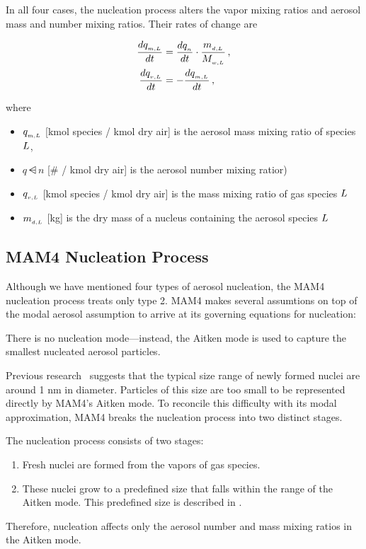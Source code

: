 In all four cases, the nucleation process alters the vapor mixing ratios and
aerosol mass and number mixing ratios. Their rates of change are

\begin{align}
\frac{d q\dsub{m,\specidx}}{dt} &= \frac{d q\dsub{n}}{dt} \cdot \frac{m\dsub{d,\specidx}}{\mw{\specidx}} \,, \labeleq{nuc:aer}\\
\frac{d\vmass{\specidx}}{dt} &= -\frac{d q\dsub{m,\specidx}}{dt} \,, \labeleq{nuc:gas}
\end{align}

where
\begin{itemize}
  \item $q_{_{m,L}}$ [kmol species / kmol dry air] is the aerosol mass
        mixing ratio of species $L$,
  \item $q\dsub{n}$ [\# / kmol dry air] is the aerosol number mixing ratior)
  \item $q_{_{v,L}}$ [kmol species / kmol dry air] is the mass mixing
        ratio of gas species $L$
  \item $m_{_{d,L}}$ [kg] is the dry mass of a nucleus containing the
        aerosol species $L$
\end{itemize}

\subsection{MAM4 Nucleation Process}

Although we have mentioned four types of aerosol nucleation, the MAM4 nucleation
process treats only type 2. MAM4 makes several assumtions on top of the modal
aerosol assumption to arrive at its governing equations for nucleation:

\begin{assume}
  There is no nucleation mode---instead, the Aitken mode is used to capture the
  smallest nucleated aerosol particles.
\end{assume}

Previous research~\cite{kerminen-2002-jas} suggests that the typical size
range of newly formed nuclei are around 1 nm in diameter. Particles of this
size are too small to be represented directly by MAM4's Aitken mode. To
reconcile this difficulty with its modal approximation, MAM4 breaks the
nucleation process into two distinct stages.

\begin{assume}
  The nucleation process consists of two stages:
  \begin{enumerate}
    \item Fresh nuclei are formed from the vapors of gas species.
    \item These nuclei grow to a predefined size that falls within the range
      of the Aitken mode. This predefined size is described in
      .
  \end{enumerate}
  Therefore, nucleation affects only the aerosol number and mass mixing ratios
  in the Aitken mode.
\end{assume}

